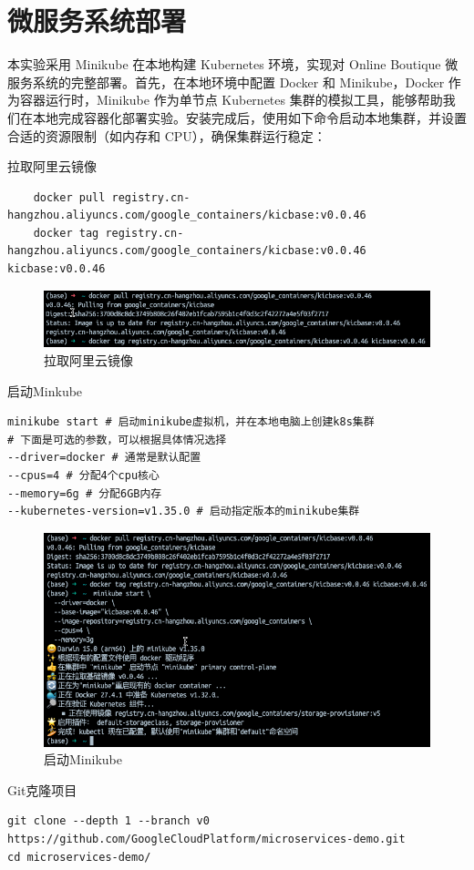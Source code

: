 \documentclass[hyperref,a4paper,UTF8]{ctexart}
\begin{document}
\section{微服务系统部署}
本实验采用 Minikube 在本地构建 Kubernetes 环境，实现对 Online Boutique 微服务系统的完整部署。首先，在本地环境中配置 Docker 和 Minikube，Docker 作为容器运行时，Minikube 作为单节点 Kubernetes 集群的模拟工具，能够帮助我们在本地完成容器化部署实验。安装完成后，使用如下命令启动本地集群，并设置合适的资源限制（如内存和 CPU），确保集群运行稳定：

拉取阿里云镜像
\begin{lstlisting}
    docker pull registry.cn-hangzhou.aliyuncs.com/google_containers/kicbase:v0.0.46
    docker tag registry.cn-hangzhou.aliyuncs.com/google_containers/kicbase:v0.0.46 kicbase:v0.0.46
\end{lstlisting}
\begin{figure}[H]
    \centering
    \includegraphics[width=0.75\linewidth]{部署/aliyun.png}
    \caption{拉取阿里云镜像}
    \label{fig:enter-label}
\end{figure}

启动Minkube
\begin{lstlisting}
minikube start # 启动minikube虚拟机，并在本地电脑上创建k8s集群
# 下面是可选的参数，可以根据具体情况选择
--driver=docker # 通常是默认配置
--cpus=4 # 分配4个cpu核心
--memory=6g # 分配6GB内存
--kubernetes-version=v1.35.0 # 启动指定版本的minikube集群
\end{lstlisting}
\begin{figure}[H]
    \centering
    \includegraphics[width=0.75\linewidth]{部署/start.png}
    \caption{启动Minikube}
    \label{fig:enter-label}
\end{figure}

Git克隆项目
\begin{lstlisting}
git clone --depth 1 --branch v0 https://github.com/GoogleCloudPlatform/microservices-demo.git
cd microservices-demo/
\end{lstlisting}
\end{document}
